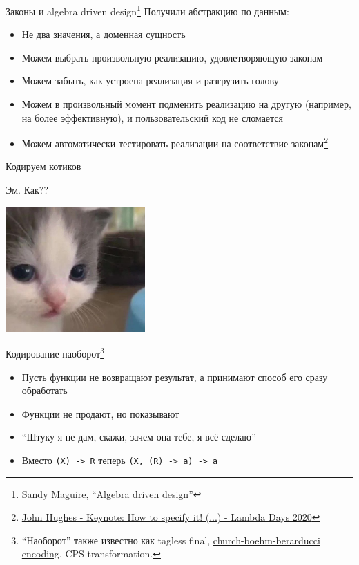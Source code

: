     \begin{frame}[fragile]{Законы и algebra driven design\footnote{Sandy Maguire, ``Algebra driven design''} \popslide}
        Получили абстракцию по данным:
        \begin{itemize}
            \item Не два значения, а доменная сущность
            \item Можем выбрать произвольную реализацию, удовлетворяющую законам
            \item Можем забыть, как устроена реализация и разгрузить голову
            \item Можем в произвольный момент подменить реализацию на другую (например, на более эффективную), и пользовательский код не сломается
            \item Можем автоматически тестировать реализации на соответствие законам\footnote{\href{https://youtu.be/G0NUOst-53U?si=yrFoPQ-kSSPF1Xtb}{\color{blue} John Hughes - Keynote: How to specify it! (...) - Lambda Days 2020}}
        \end{itemize}
    \end{frame}

    \begin{frame}[fragile]{Кодируем котиков}
        \pause
        \begin{center}
            Эм. Как??
            \vspace{1em}

            \includegraphics[width=0.4\textwidth]{figs/wat}
        \end{center}
    \end{frame}

    \begin{frame}[fragile]{Кодирование наоборот\footnote{``Наоборот'' также известно как tagless final, \href{https://okmij.org/ftp/tagless-final/course/Boehm-Berarducci.html}{\color{blue} church-boehm-berarducci encoding}, CPS transformation.}}
        \begin{itemize}
            \item Пусть функции не возвращают результат, а принимают способ его сразу обработать
            \item[\then] Функции не продают, но показывают
            \item[\then] ``Штуку я не дам, скажи, зачем она тебе, я всё сделаю''
            \item Вместо \texttt{(X) -> R} теперь \texttt{(X, (R) -> a) -> a}
        \end{itemize}
    \end{frame}

